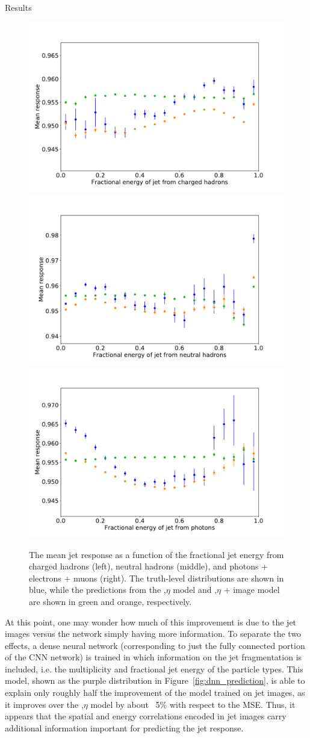 \begin{section}{Results}
\begin{figure}[tbp!]
\begin{center}
\includegraphics[angle=0,width=0.45\columnwidth]{fig/response_chf.pdf}
\includegraphics[angle=0,width=0.45\columnwidth]{fig/response_nhf.pdf}
\includegraphics[angle=0,width=0.45\columnwidth]{fig/response_phf.pdf}
\end{center}
\caption{The mean jet response as a function of the fractional jet energy from charged hadrons (left), neutral hadrons (middle), and photons + electrons + muons (right). The truth-level distributions are shown in blue, while the predictions from the \pT,$\eta$ model and \pT,$\eta$ + image model are shown in green and orange, respectively.}
\label{fig:response_energyfrac}
\end{figure}

At this point, one may wonder how much of this improvement is due to the jet images versus the network simply having more information.
To separate the two effects, a dense neural network (corresponding to just the fully connected portion of the CNN network) is trained in which information on the jet fragmentation is included, i.e. the multiplicity and fractional jet energy of the particle types.
This model, shown as the purple distribution in Figure~\ref{fig:dnn_prediction}, is able to explain only roughly half the improvement of the model trained on jet images, as it improves over the \pT,$\eta$ model by about ~5\% with respect to the MSE.
Thus, it appears that the spatial and energy correlations encoded in jet images carry additional information important for predicting the jet response.


\end{section}
